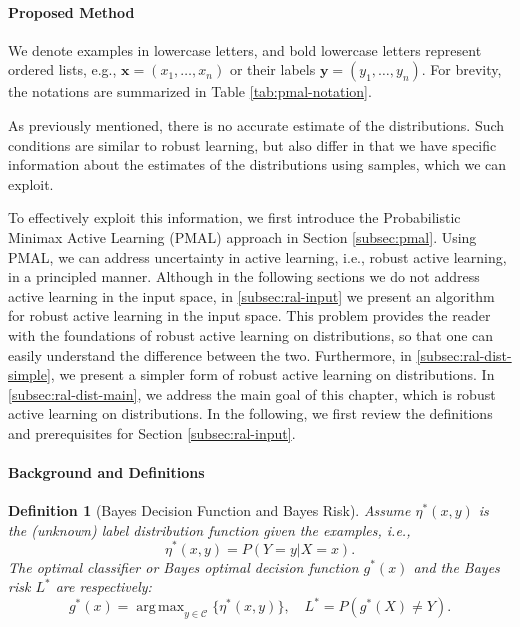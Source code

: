 \documentclass[12pt]{article}
\newtheorem{definition}{Definition}[section]
\DeclareMathOperator*{\argmax}{arg\,max}
\begin{document}
	\paragraph{Proposed Method}
	We denote examples in lowercase letters, and bold lowercase letters represent ordered lists, e.g., $\mathbf{x} = (x_1, \ldots, x_n)$ or their labels $\mathbf{y} = (y_1, \ldots, y_n)$. For brevity, the notations are summarized in Table \ref{tab:pmal-notation}.
	
	As previously mentioned, there is no accurate estimate of the distributions. Such conditions are similar to robust learning, but also differ in that we have specific information about the estimates of the distributions using samples, which we can exploit.
	
	To effectively exploit this information, we first introduce the Probabilistic Minimax Active Learning (PMAL) approach in Section \ref{subsec:pmal}. Using PMAL, we can address uncertainty in active learning, i.e., robust active learning, in a principled manner. Although in the following sections we do not address active learning in the input space, in \ref{subsec:ral-input} we present an algorithm for robust active learning in the input space. This problem provides the reader with the foundations of robust active learning on distributions, so that one can easily understand the difference between the two. Furthermore, in \ref{subsec:ral-dist-simple}, we present a simpler form of robust active learning on distributions. In \ref{subsec:ral-dist-main}, we address the main goal of this chapter, which is robust active learning on distributions. In the following, we first review the definitions and prerequisites for Section \ref{subsec:ral-input}.
	
	\paragraph{Background and Definitions}
	\begin{definition}[Bayes Decision Function and Bayes Risk]
		\label{def:bayes-risk}
		Assume $\eta^*(x, y)$ is the (unknown) label distribution function given the examples, i.e.,
		\begin{equation}
			\eta^*(x, y) = P(Y = y | X = x).
		\end{equation}
		The optimal classifier or Bayes optimal decision function $g^*(x)$ and the Bayes risk $L^*$ are respectively:
		\begin{equation}
			g^*(x) = \argmax_{y \in \mathcal{C}} \{\eta^*(x, y)\}, \quad L^* = P(g^*(X) \neq Y).
		\end{equation}
	\end{definition}
	
\end{document}
